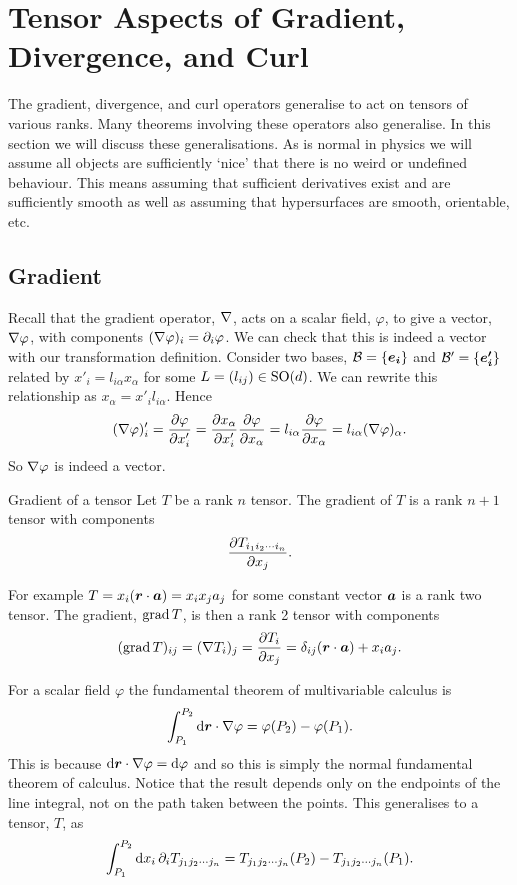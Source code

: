 \section{Tensor Aspects of Gradient, Divergence, and Curl}
The gradient, divergence, and curl operators generalise to act on tensors of various ranks.
Many theorems involving these operators also generalise.
In this section we will discuss these generalisations.
As is normal in physics we will assume all objects are sufficiently `nice' that there is no weird or undefined behaviour.
This means assuming that sufficient derivatives exist and are sufficiently smooth as well as assuming that hypersurfaces are smooth, orientable, etc.

\subsection{Gradient}
Recall that the gradient operator, \(\nabla\), acts on a scalar field, \(\varphi\), to give a vector, \(\nabla\varphi\), with components \((\nabla\varphi)_i = \partial_i\varphi\).
We can check that this is indeed a vector with our transformation definition.
Consider two bases, \(\mathcal{B} = \{\bm{e_{i}}\}\) and \(\mathcal{B}' = \{\bm{e'_{i}}\}\) related by \(x'_i = l_{i\alpha}x_\alpha\) for some \(L = (l_{ij})\in\mathrm{SO}(d)\).
We can rewrite this relationship as \(x_{\alpha} = x'_il_{i\alpha}\).
Hence
\[(\nabla\varphi)'_i = \pdv{\varphi}{x'_i} = \pdv{x_{\alpha}}{x'_i} \pdv{\varphi}{x_\alpha} = l_{i\alpha}\pdv{\varphi}{x_{\alpha}} = l_{i\alpha}(\nabla\varphi)_\alpha.\]
So \(\nabla\varphi\) is indeed a vector.

\begin{definition}{Gradient of a tensor}{}
    Let \(T\) be a rank \(n\) tensor.
    The gradient of \(T\) is a rank \(n + 1\) tensor with components
    \[\pdv{T_{{ {i}_1 {i}_2 \dotsm {i}_{n} }}}{x_j}.\]
\end{definition}
For example \(T = x_i(\bm{r}\cdot\bm{a}) = x_ix_ja_j\) for some constant vector \(\bm{a}\) is a rank two tensor.
The gradient, \(\operatorname{grad} T\), is then a rank 2 tensor with components
\[(\operatorname{grad} T)_{ij} = (\nabla T_i)_j = \pdv{T_i}{x_j} = \delta_{ij}(\bm{r}\cdot\bm{a}) + x_ia_j.\]

For a scalar field \(\varphi\) the fundamental theorem of multivariable calculus is
\[\int_{P_1}^{P_2} \dd{\bm{r}}\cdot \nabla\varphi = \varphi(P_2) - \varphi(P_1).\]
This is because \(\dd{\bm{r}}\cdot\nabla\varphi = \dd{\varphi}\) and so this is simply the normal fundamental theorem of calculus.
Notice that the result depends only on the endpoints of the line integral, not on the path taken between the points.
This generalises to a tensor, \(T\), as
\[\int_{P_1}^{P_2} \dd{x_i} \partial_i T_{{ {j}_1 {j}_2 \dotsm {j}_{n} }} = T_{{ {j}_1 {j}_2 \dotsm {j}_{n} }}(P_2) - T_{{ {j}_1 {j}_2 \dotsm {j}_{n} }}(P_1).\]

